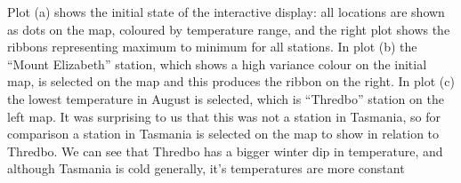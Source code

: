 \documentclass[
]{jss}
\newenvironment{Shaded}{\begin{snugshade}}{\end{snugshade}}
\newcommand{\AttributeTok}[1]{\textcolor[rgb]{0.77,0.63,0.00}{#1}}
\newcommand{\FunctionTok}[1]{\textcolor[rgb]{0.00,0.00,0.00}{#1}}
\newcommand{\NormalTok}[1]{#1}
\newcommand{\OtherTok}[1]{\textcolor[rgb]{0.56,0.35,0.01}{#1}}
\newcommand{\SpecialCharTok}[1]{\textcolor[rgb]{0.00,0.00,0.00}{#1}}
\newcommand{\StringTok}[1]{\textcolor[rgb]{0.31,0.60,0.02}{#1}}
\begin{document}
\begin{Shaded}
\end{Shaded}

Plot (a) shows the initial state of the interactive display: all
locations are shown as dots on the map, coloured by temperature range,
and the right plot shows the ribbons representing maximum to minimum for
all stations. In plot (b) the ``Mount Elizabeth'' station, which shows a
high variance colour on the initial map, is selected on the map and this
produces the ribbon on the right. In plot (c) the lowest temperature in
August is selected, which is ``Thredbo'' station on the left map. It was
surprising to us that this was not a station in Tasmania, so for
comparison a station in Tasmania is selected on the map to show in
relation to Thredbo. We can see that Thredbo has a bigger winter dip in
temperature, and although Tasmania is cold generally, it's temperatures
are more constant
\end{document}
